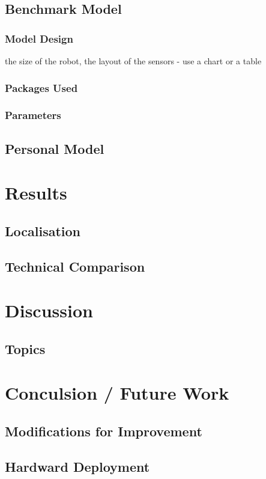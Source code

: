 \documentclass[a4paper]{article}
\begin{document}
\subsection{Benchmark Model}
\subsubsection{Model Design}
the size of the robot, the layout of the sensors - use a chart or a table

\subsubsection{Packages Used}


\subsubsection{Parameters}

\subsection{Personal Model}

\section{Results}
\subsection{Localisation}
\subsection{Technical Comparison}

\section{Discussion}

\subsection{Topics}

\section{Conculsion / Future Work}
\subsection{Modifications for Improvement}
\subsection{Hardward Deployment}



\end{document}
